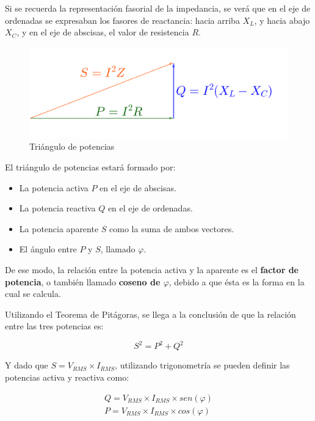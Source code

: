 Si se recuerda la representación fasorial de la impedancia, se verá que en el eje de ordenadas se expresaban los fasores de reactancia: hacia arriba $X_L$, y hacia abajo $X_C$, y en el eje de abscisas, el valor de resistencia $R$.

\begin{figure}[htbp]
  \includegraphics[scale=0.16]{images/triangulo_potencias}
  \caption{Triángulo de potencias}
  \label{fig:triangulo_potencias}
\end{figure}

El triángulo de potencias estará formado por:
\begin{itemize}
	\item La potencia activa $P$ en el eje de abscisas.
	\item La potencia reactiva $Q$ en el eje de ordenadas.
	\item La potencia aparente $S$ como la suma de ambos vectores.
	\item El ángulo entre $P$ y $S$, llamado $\varphi$.
\end{itemize}

De ese modo, la relación entre la potencia activa y la aparente es el \textbf{factor de potencia}, o también llamado \textbf{coseno de $\varphi$}, debido a que ésta es la forma en la cual se calcula.

Utilizando el Teorema de Pitágoras, se llega a la conclusión de que la relación entre las tres potencias es:

\begin{equation}
	\label{eq:potencias_alterna}
	S^{2}=P^{2}+Q^{2}
\end{equation}

Y dado que $S=V_{RMS}\times I_{RMS}$, utilizando trigonometría se pueden definir las potencias activa y reactiva como:

\begin{eqnarray}
	\label{eq:potencia_reactiva}
	Q=V_{RMS}\times I_{RMS} \times sen(\varphi) \\
	\label{eq:potencia_activa}
	P=V_{RMS}\times I_{RMS} \times cos(\varphi)
\end{eqnarray}

